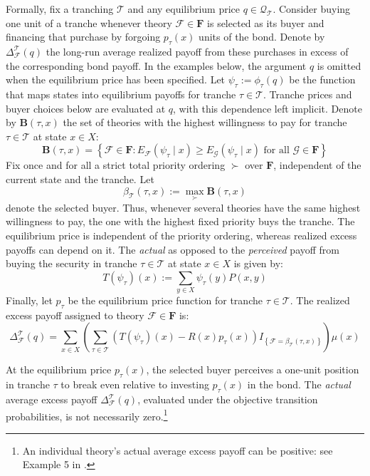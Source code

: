 \documentclass[11pt]{article}
\theoremstyle{plain}
\begin{document}
Formally, fix a tranching $\mathcal{T}$ and any equilibrium price $q\in\mathcal{Q}_{\mathcal{T}}$. Consider buying one unit of a tranche whenever theory $\mathcal{F}\in\mathbf{F}$ is selected as its buyer and financing that purchase by forgoing $p_\tau(x)$ units of the bond. Denote by $\Delta_\mathcal{F}^{\mathcal{T}}(q)$ the long-run average realized payoff from these purchases in excess of the corresponding bond payoff. In the examples below, the argument $q$ is omitted when the equilibrium price has been specified. Let $\psi_\tau:=\phi_\tau(q)$ be the function that maps states into equilibrium payoffs for tranche $\tau\in\mathcal{T}$. Tranche prices and buyer choices below are evaluated at $q$, with this dependence left implicit. Denote by $\mathbf{B}(\tau,x)$ the set of theories with the highest willingness to pay for tranche $\tau\in\mathcal{T}$ at state $x\in X$:
\begin{equation*}
\mathbf{B}
(\tau,x)=
\left\{
\mathcal{F}\in\mathbf{F}:
E_\mathcal{F}(\psi_\tau\mid x)
\geq
E_{\mathcal{G}}(\psi_\tau\mid x)
\text{ for all } \mathcal{G}\in\mathbf{F}
\right\}
\end{equation*}
Fix once and for all a strict total priority ordering $\succ$ over $\mathbf{F}$, independent of the current state and the tranche. Let
\[
\beta_{\mathcal{T}}(\tau,x)
:=
\max_{\succ}\mathbf{B}(\tau,x)
\]
denote the selected buyer. Thus, whenever several theories have the same highest willingness to pay, the one with the highest fixed priority buys the tranche. The equilibrium price is independent of the priority ordering, whereas realized excess payoffs can depend on it.
The \textit{actual} as opposed to the \textit{perceived} payoff from buying the security in tranche $\tau\in\mathcal{T}$ at state $x\in X$ is given by:
\[
T(\psi_\tau)(x):=\sum_{y\in X}\psi_\tau(y)P(x,y)
\]
Finally, let $p_\tau$ be the equilibrium price function for tranche $\tau\in\mathcal{T}$. The realized excess payoff assigned to theory $\mathcal{F}\in\mathbf{F}$ is:
\begin{equation} \label{eq:exr}
\Delta_\mathcal{F}^{\mathcal{T}}(q)
=
\sum_{x\in X}
\left(
\sum_{\tau\in\mathcal{T}}
\left(
T(\psi_\tau)(x)-
R(x)p_\tau(x)
\right)
I_{\left\{\mathcal{F}=\beta_{\mathcal{T}}(\tau,x)\right\}}
\right)\mu(x)
\end{equation}

At the equilibrium price $p_\tau(x)$, the selected buyer perceives a one-unit position in tranche $\tau$ to break even relative to investing $p_\tau(x)$ in the bond. The \textit{actual} average excess payoff $\Delta_\mathcal{F}^{\mathcal{T}}(q)$, evaluated under the objective transition probabilities, is not necessarily zero.\footnote{An individual theory's actual average excess payoff can be positive: see Example 5 in \cite{EysterPiccione2014}.}
\end{document}
